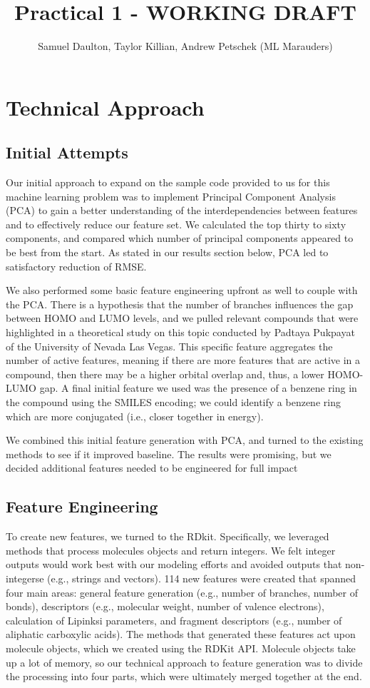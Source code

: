 \documentclass[11pt, oneside]{article}   	%
\title{Practical 1 - WORKING DRAFT}
\author{Samuel Daulton, Taylor Killian, Andrew Petschek (ML Marauders)}
\begin{document}
\maketitle
\section{Technical Approach}
\subsection{Initial Attempts} 


Our initial approach to expand on the sample code provided to us for this machine learning problem was to implement Principal Component Analysis (PCA) to gain a better understanding of the interdependencies between features and to effectively reduce our feature set. We calculated the top thirty to sixty components, and compared which number of principal components appeared to be best from the start. As stated in our results section below, PCA led to satisfactory reduction of RMSE.

We also performed some basic feature engineering upfront as well to couple with the PCA. There is a hypothesis that the number of branches influences the gap between HOMO and LUMO levels, and we pulled relevant compounds that were highlighted in a theoretical study on this topic conducted by Padtaya Pukpayat of the University of Nevada Las Vegas. This specific feature aggregates the number of active features, meaning if there are more features that are active in a compound, then there may be a higher orbital overlap and, thus, a lower HOMO-LUMO gap. A final initial feature we used was the presence of a benzene ring in the compound using the SMILES encoding; we could identify a benzene ring  which are more conjugated (i.e., closer together in energy). 

We combined this initial feature generation with PCA, and turned to the existing methods to see if it improved baseline. The results were promising, but we decided additional features needed to be engineered for full impact 

\subsection{Feature Engineering} 

To create new features, we turned to the RDkit. Specifically, we leveraged methods that process molecules objects and return integers. We felt integer outputs would work best with our modeling efforts and avoided outputs that non-integerse (e.g., strings and vectors). 114 new features were created that spanned four main areas: general feature generation (e.g., number of branches, number of bonds), descriptors (e.g., molecular weight, number of valence electrons), calculation of Lipinksi parameters, and fragment descriptors (e.g., number of aliphatic carboxylic acids). The methods that generated these features act upon molecule objects, which we created using the RDKit API. Molecule objects take up a lot of memory, so our technical approach to feature generation was to divide the processing into four parts, which were ultimately merged together at the end. 
\end{document}
